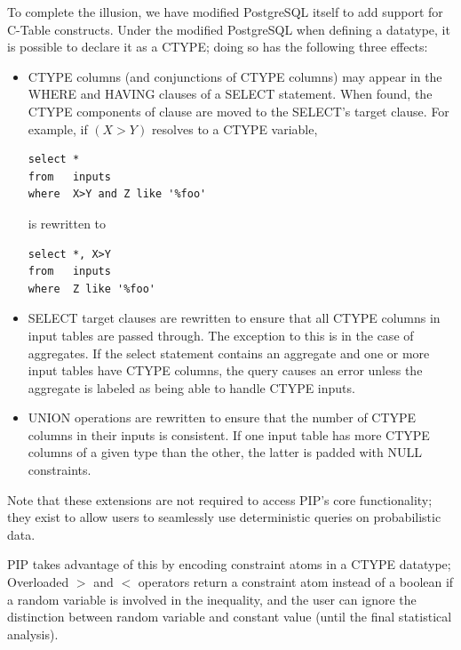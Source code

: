 
To complete the illusion, we have modified PostgreSQL itself to add support for C-Table constructs.  Under the modified PostgreSQL when defining a datatype, it is possible to declare it as a CTYPE; doing so has the following three effects:
\begin{itemize}
\item CTYPE columns (and conjunctions of CTYPE columns) may appear in the WHERE and HAVING clauses of a SELECT statement.  When found, the CTYPE components of clause are moved to the SELECT's target clause.  For example, if $(X>Y)$ resolves to a CTYPE variable, 
\begin{verbatim}
select *
from   inputs
where  X>Y and Z like '%foo'
\end{verbatim}
is rewritten to
\begin{verbatim}
select *, X>Y
from   inputs
where  Z like '%foo'
\end{verbatim}

\item SELECT target clauses are rewritten to ensure that all CTYPE columns in input tables are passed through.   The exception to this is in the case of aggregates.  If the select statement contains an aggregate and one or more input tables have CTYPE columns, the query causes an error unless the aggregate is labeled as being able to handle CTYPE inputs.

\item UNION operations are rewritten to ensure that the number of CTYPE columns in their inputs is consistent.  If one input table has more CTYPE columns of a given type than the other, the latter is padded with NULL constraints.

\end{itemize}

Note that these extensions are not required to access PIP's core functionality; they exist to allow users to seamlessly use deterministic queries on probabilistic data.

PIP takes advantage of this by encoding constraint atoms in a CTYPE datatype; Overloaded $>$ and $<$ operators return a constraint atom instead of a boolean if a random variable is involved in the inequality, and the user can ignore the distinction between random variable and constant value (until the final statistical analysis).

